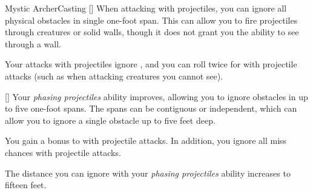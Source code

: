 \begin{feat}{Mystic Archer}{Casting}
        [] When attacking with projectiles, you can ignore all physical obstacles in single one-foot span.
        This can allow you to fire projectiles through creatures or solid walls, though it does not grant you the ability to see through a wall.

         Your attacks with projectiles ignore , and you can roll twice for  with projectile attacks (such as when attacking creatures you cannot see).

        [] Your \textit{phasing projectiles} ability improves, allowing you to ignore obstacles in up to five one-foot spans.
        The spans can be contiguous or independent, which can allow you to ignore a single obstacle up to five feet deep.

         You gain a  bonus to  with projectile attacks.
        In addition, you ignore all miss chances with projectile attacks.

         The distance you can ignore with your \textit{phasing projectiles} ability increases to fifteen feet.
    \end{feat}

